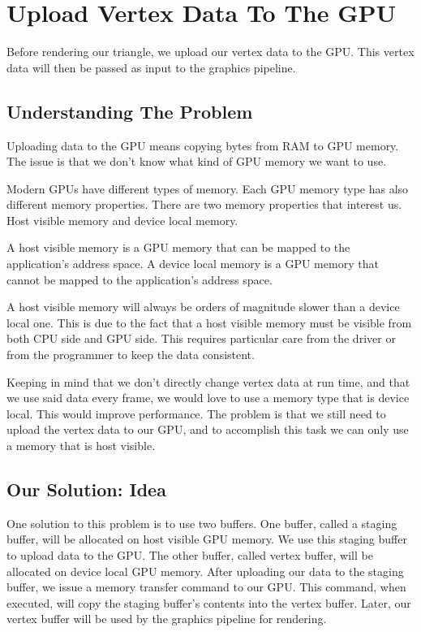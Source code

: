 \section{Upload Vertex Data To The GPU}

Before rendering our triangle, we upload our vertex data to the GPU.
This vertex data will then be passed as input to the graphics pipeline.

\subsection{Understanding The Problem}

Uploading data to the GPU means copying bytes from RAM to GPU memory.
The issue is that we don't know what kind of GPU memory we want to use.

Modern GPUs have different types of memory.
Each GPU memory type has also different memory properties.
There are two memory properties that interest us.
Host visible memory and device local memory.

A host visible memory is a GPU memory that can be mapped to the
application's address space.
A device local memory is a GPU memory that cannot be mapped to the
application's address space.

A host visible memory will always be orders of magnitude slower than a
device local one.
This is due to the fact that a host visible memory must be visible from both
CPU side and GPU side.
This requires particular care from the driver or from the programmer
to keep the data consistent.

Keeping in mind that we don't directly change vertex data at run time,
and that we use said data every frame, we would love to use a memory type
that is device local.
This would improve performance.
The problem is that we still need to upload the vertex data to our GPU,
and to accomplish this task we can only use a memory that is host visible.

\subsection{Our Solution: Idea}

One solution to this problem is to use two buffers.
One buffer, called a staging buffer, will be allocated on host visible
GPU memory.
We use this staging buffer to upload data to the GPU.
The other buffer, called vertex buffer, will be allocated on device local
GPU memory.
After uploading our data to the staging buffer, we issue a memory transfer command
to our GPU.
This command, when executed, will copy the staging buffer's contents
into the vertex buffer.
Later, our vertex buffer will be used by the graphics pipeline for rendering.

